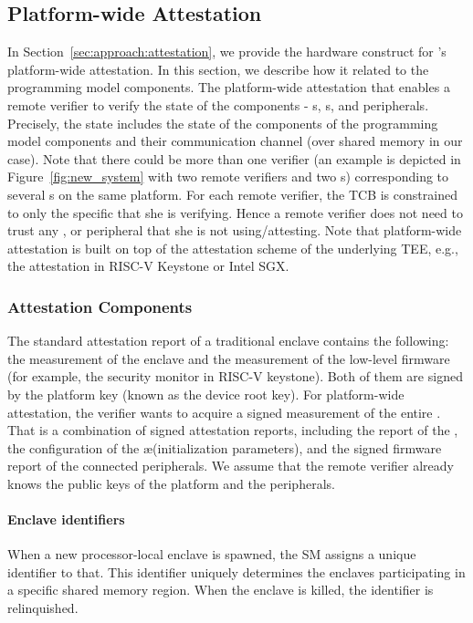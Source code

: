 \subsection{Platform-wide Attestation}
\label{sec:programmingModel:attestation}

In Section~\ref{sec:approach:attestation}, we provide the hardware construct for \name{}'s platform-wide attestation. In this section, we describe how it related to the programming model components. The platform-wide attestation that enables a remote verifier to verify the state of the \nameenclave components - \app{}s, \ce{}s, and peripherals. Precisely, the state includes the state of the components of the programming model components and their communication channel (over shared memory in our case). Note that there could be more than one verifier (an example is depicted in Figure~\ref{fig:new_system} with two remote verifiers and two \nameenclave{}s) corresponding to several \nameenclave{}s on the same platform. For each remote verifier, the TCB is constrained to only the specific \nameenclave that she is verifying. Hence a remote verifier does not need to trust any \app, \ce or peripheral that she is not using/attesting. Note that platform-wide attestation is built on top of the attestation scheme of the underlying TEE, e.g., the attestation in RISC-V Keystone or Intel SGX. %

\subsubsection{Attestation Components}
\label{sec:programmingModel:attestation:components}

The standard attestation report of a traditional enclave contains the following: the measurement of the enclave and the measurement of the low-level firmware (for example, the security monitor in RISC-V keystone). Both of them are signed by the platform key (known as the device root key). For platform-wide attestation, the verifier wants to acquire a signed measurement of the entire \nameenclave{}. That is a combination of signed attestation reports, including the report of the \ce, the configuration of the \ae (initialization parameters), and the signed firmware report of the connected peripherals. We assume that the remote verifier already knows the public keys of the platform and the peripherals.

\paragraph*{Enclave identifiers} When a new processor-local enclave is spawned, the SM assigns a unique identifier to that. This identifier uniquely determines the enclaves participating in a specific shared memory region. When the enclave is killed, the identifier is relinquished.


